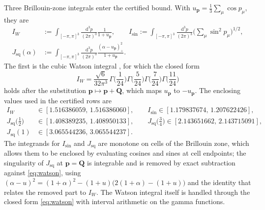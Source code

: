 \documentclass[11pt]{article}
\numberwithin{equation}{section}
\newcommand{\dd}{\mathrm{d}}
\theoremstyle{definition}
\begin{document}
Three Brillouin-zone integrals enter the certified bound. With
$u_{\mathbf p}=\frac13\sum_{\mu}\cos p_{\mu}$, they are
\begin{equation}
\begin{aligned}
I_{W}&:=\int_{[-\pi,\pi]^{3}}\frac{\dd^{3}p}{(2\pi)^{3}}\frac{1}{1+u_{\mathbf p}},\qquad
I_{\sin}:=\int_{[-\pi,\pi]^{3}}\frac{\dd^{3}p}{(2\pi)^{3}}\Big(\sum_{\mu}\sin^{2}p_{\mu}\Big)^{1/2},\\
J_{\mathrm{sq}}(\alpha)&:=\int_{[-\pi,\pi]^{3}}\frac{\dd^{3}p}{(2\pi)^{3}}\frac{(\alpha-u_{\mathbf p})_{+}^{2}}{1+u_{\mathbf p}} .
\end{aligned}
\end{equation}
The first is the cubic Watson integral \cite{watson1939,glasser1977}, for which the
closed form
\begin{equation}
I_{W}=\frac{\sqrt6}{32\pi^{3}}\,\Gamma\Big(\frac{1}{24}\Big)\Gamma\Big(\frac{5}{24}\Big)\Gamma\Big(\frac{7}{24}\Big)\Gamma\Big(\frac{11}{24}\Big)
\label{eq:watson}
\end{equation}
holds after the substitution $\mathbf p\mapsto\mathbf p+\mathbf Q$, which maps
$u_{\mathbf p}$ to $-u_{\mathbf p}$. The enclosing values used in the certified rows are
\begin{equation}
\begin{aligned}
I_{W}&\in[1.516386059,\,1.516386060],\qquad
I_{\sin}\in[1.179837674,\,1.207622426],\\
J_{\mathrm{sq}}\big(\tfrac12\big)&\in[1.408389235,\,1.408950133],\qquad
J_{\mathrm{sq}}\big(\tfrac34\big)\in[2.143651662,\,2.143715091],\\
J_{\mathrm{sq}}(1)&\in[3.065544236,\,3.065544237].
\end{aligned}
\end{equation}
The integrands for $I_{\sin}$ and $J_{\mathrm{sq}}$ are monotone on cells of the
Brillouin zone, which allows them to be enclosed by evaluating cosines and sines at cell
endpoints; the singularity of $J_{\mathrm{sq}}$ at $\mathbf p=\mathbf Q$ is integrable and
is removed by exact subtraction against \eqref{eq:watson}, using
$(\alpha-u)^{2}=(1+\alpha)^{2}-(1+u)\big(2(1+\alpha)-(1+u)\big)$ and the identity that
relates the removed part to $I_{W}$. The Watson integral itself is handled through the
closed form \eqref{eq:watson} with interval arithmetic on the gamma functions.

\sloppy


\end{document}
